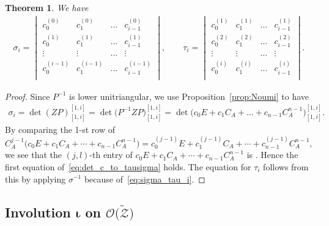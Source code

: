 \documentclass[10pt,a4paper]{amsart}
\numberwithin{equation}{section}
\newtheorem{Theorem}{Theorem}[section]
\theoremstyle{definition}
\begin{document}
\begin{Theorem}\label{thm:det_c_to_tausigma}
We have
\begin{equation}\label{eq:det_c_to_tausigma}
\begin{gathered}
\sigma_i=
\begin{vmatrix}
c^{(0)}_{0} & c^{(0)}_{1} & \dots & c^{(0)}_{i-1}\\
c^{(1)}_{0} & c^{(1)}_{1} & \dots & c^{(1)}_{i-1}\\
\vdots & \vdots & \dots & \vdots \\
c^{(i-1)}_{0} & c^{(i-1)}_{1} & \dots & c^{(i-1)}_{i-1}\\
\end{vmatrix}, \qquad
\tau_i=
\begin{vmatrix}
c^{(1)}_{0} & c^{(1)}_{1} & \dots &c^{(1)}_{i-1}\\
c^{(2)}_{0} & c^{(2)}_{1} & \dots &c^{(2)}_{i-1}\\
\vdots & \vdots & \dots & \vdots\\
c^{(i)}_{0} & c^{(i)}_{1} & \dots &c^{(i)}_{i-1}\\
\end{vmatrix}.
\end{gathered}
\end{equation}
\end{Theorem}

\begin{proof}
Since $P^{-1}$ is lower unitriangular, we use
Proposition~\ref{prop:Noumi} to have
\[
\begin{aligned}
\sigma_i=\det(ZP)^{[1,i]}_{[1,i]}
=
\det\bigl(P^{-1}ZP\bigr)^{[1,i]}_{[1,i]}=
\det\bigl(c_0E+c_1C_A+\dots+c_{n-1}C_A^{n-1}\bigr)^{[1,i]}_{[1,i]}.
\end{aligned}
\]
By comparing the 1-st row of
\[
C_A^{j-1}\bigl(c_0E+c_1C_A+\cdots+c_{n-1}C_A^{n-1}\bigr)
=c_0^{(j-1)}E+c_1^{(j-1)}C_A+\cdots+c_{n-1}^{(j-1)}C_A^{n-1},
\]
we see that the
$(j,l)$-th entry of $c_0E+c_1C_A+\cdots+c_{n-1}C_A^{n-1}$
is
.
Hence the first equation of~\eqref{eq:det_c_to_tausigma} holds.
The equation for $\tau_i$ follows from this by applying $\sigma^{-1}$ because of~\eqref{eq:sigma_tau_i}.
\end{proof}

\subsection[Involution iota on O(Z)]{Involution $\boldsymbol{\iota}$ on $\boldsymbol{\mathscr{O}\bigl(\tilde{\mathscr{Z}}\bigr)}$}
\label{sec:iota on OZ}
\end{document}
